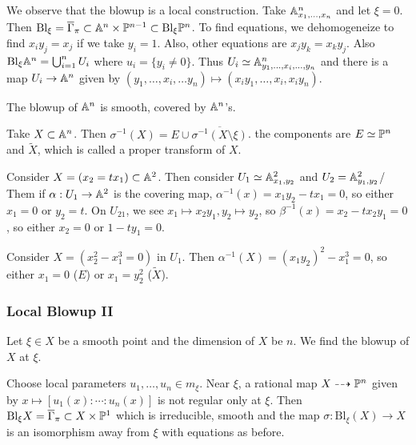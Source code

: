 \documentclass[twoside, 10pt]{article}
\begin{document}
    We observe that the blowup is a local construction. Take $\A^n_{x_1,
    \ldots, x_n}$ and let $\xi = 0$. Then $\mathrm{Bl}_{\xi} =
    \overline{\Gamma}_{\pi} \subset \A^n \times \P^{n-1} \subset
    \mathrm{Bl}_{\xi} \P^n$. To find equations, we dehomogeneize to find
    $x_iy_j=x_j$ if we take $y_i = 1$. Also, other equations are $x_jy_k =
    x_ky_j$. Also $\mathrm{Bl}_{\xi}\A^n = \bigcup_{i=1}^n U_i$ where $u_i =
    \{y_i \neq 0\}$. Thus $U_i \simeq \A^n_{y_1, \ldots, x_i, \ldots, y_n}$ and
    there is a map $U_i \to \A^n$ given by $(y_1, \ldots, x_i, \ldots y_n)
    \mapsto (x_iy_1, \ldots, x_i, x_iy_n)$.

    \begin{cor} The blowup of $\A^n$ is smooth, covered by $\A^n$'s.  \end{cor}

    \begin{defn} Take $X \subset \A^n$. Then $\sigma^{-1}(X)
    = E \cup \overline{\sigma^{-1}(X \setminus \xi)}$. the components are $E
\simeq \P^n$ and $\widetilde{X}$, which is called a proper transform of $X$.
\end{defn}

    \begin{exm} Consider $X = (x_2=tx_1) \subset \A^2$. Then consider $U_1
        \simeq \A^2_{x_1,y_2}$ and $U_2 = \A^2_{y_1,y_2}$/ Them if $\alpha:U_1
        \to \A^2$ is the covering map, $\alpha^{-1}(x) = x_1y_2-tx_1=0$, so
        either $x_1=0$ or $y_2=t$. On $U_{21}$, we see $x_1 \mapsto x_2y_1, y_2
    \mapsto y_2$, so $\beta^{-1}(x) = x_2-tx_2y_1 = 0$, so either $x_2 = 0$ or
$1-ty_1 = 0$.  \end{exm}

    \begin{exm} Consider $X  =(x_2^2-x_1^3=0)$ in $U_1$. Then $\alpha^{-1}(X) =
    (x_1y_2)^2-x_1^3 = 0$, so either $x_1=0$ ($E$) or $x_1=y_2^2$
($\widetilde{X}$).  \end{exm}

    \subsubsection{Local Blowup II} Let $\xi \in X$ be a smooth point and the
    dimension of $X$ be $n$. We find the blowup of $X$ at $\xi$.  \begin{defn}
        Choose local parameters $u_1, \ldots, u_n \in m_{\xi}$. Near $\xi$, a
        rational map $X \dashrightarrow \P^n$ given by $x \mapsto [u_1(x):
        \cdots : u_n(x)]$ is not regular only at $\xi$. Then $\mathrm{Bl}_{\xi}
        X = \overline{\Gamma}_{\pi} \subset X \times \P^1$ which is
        irreducible, smooth and the map $\sigma: \mathrm{Bl}_{\xi}(X) \to X$ is
    an isomorphism away from $\xi$ with equations as before.  \end{defn}
\end{document}
